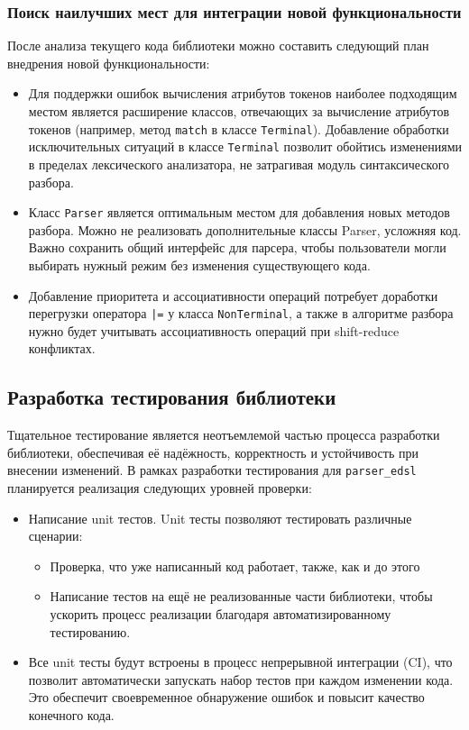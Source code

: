 \documentclass[14pt, russian]{scrartcl}
\begin{document}
\subsubsection{Поиск наилучших мест для интеграции новой функциональности}

После анализа текущего кода библиотеки можно составить следующий план внедрения новой функциональности:

\begin{itemize}
	\item Для поддержки ошибок вычисления атрибутов токенов наиболее подходящим местом является расширение классов,
	отвечающих за вычисление атрибутов токенов (например, метод \texttt{match} в классе \texttt{Terminal}).
	Добавление обработки исключительных ситуаций в классе \texttt{Terminal} позволит обойтись изменениями в
	пределах лексического анализатора, не затрагивая модуль синтаксического разбора.
	\item Класс \texttt{Parser} является оптимальным местом для добавления новых методов разбора. Можно не реализовать
	дополнительные классы Parser, усложняя код. Важно сохранить общий интерфейс для парсера, чтобы
	пользователи могли выбирать нужный режим без изменения существующего кода.
	\item Добавление приоритета и ассоциативности операций потребует доработки перегрузки оператора \texttt{|=}
	у класса \texttt{NonTerminal}, а также в алгоритме разбора нужно будет учитывать ассоциативность операций при
	shift-reduce конфликтах.
\end{itemize}

\subsection{Разработка тестирования библиотеки}

Тщательное тестирование является неотъемлемой частью процесса разработки библиотеки, обеспечивая её надёжность,
корректность и устойчивость при внесении изменений. В рамках разработки тестирования для \texttt{parser\_edsl}
планируется реализация следующих уровней проверки:

\begin{itemize}
	\item Написание unit тестов. Unit тесты позволяют тестировать различные сценарии:
		\begin{itemize}
			\item Проверка, что уже написанный код работает, также, как и до этого
			\item Написание тестов на ещё не реализованные части библиотеки, чтобы ускорить процесс реализации
			благодаря автоматизированному тестированию.
		\end{itemize}
	\item Все unit тесты будут встроены в процесс непрерывной интеграции (CI), что позволит автоматически
	запускать набор тестов при каждом изменении кода. Это обеспечит своевременное обнаружение ошибок и
	повысит качество конечного кода.
\end{itemize}
\end{document}

